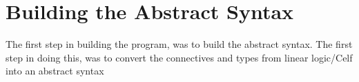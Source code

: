 \section{Building the Abstract Syntax}
\label{04_01}

The first step in building the program, was to build the abstract syntax. The first step in doing this, was to convert the connectives and types from linear logic/Celf into an abstract syntax